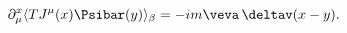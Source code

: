 \begin{equation}
\label{eq:wteins}
\partial^x_\mu\langle T J^\mu(x)\Psibar(y) \rangle_\beta =
  -im\veva\,\deltav(x-y).
\end{equation}


